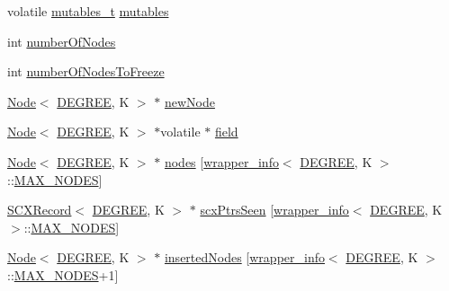 \begin{DoxyCompactItemize}
\begin{tabbing}
\end{tabbing}\item 
volatile \hyperlink{descriptors_8h_a8a5af2749482b19d7515054489efca22}{mutables\+\_\+t} \hyperlink{structbslack__ns_1_1SCXRecord_a4f87f09ecacb6e4975eeb32910f465c1}{mutables}
\item 
int \hyperlink{structbslack__ns_1_1SCXRecord_a04288a3a72e815697f4cdbf6d3a172ea}{number\+Of\+Nodes}
\item 
int \hyperlink{structbslack__ns_1_1SCXRecord_a377c265c0af0fdeb3fbb87c5fd38e353}{number\+Of\+Nodes\+To\+Freeze}
\item 
\hyperlink{structbslack__ns_1_1Node}{Node}$<$ \hyperlink{brown__sigouin__abtree__kcas_2adapter_8h_a5d88b17d70c985f2f2b8e987037fd6dd}{D\+E\+G\+R\+EE}, K $>$ $\ast$ \hyperlink{structbslack__ns_1_1SCXRecord_a98126575762cd26f08cbb6cb0177e36e}{new\+Node}
\item 
\hyperlink{structbslack__ns_1_1Node}{Node}$<$ \hyperlink{brown__sigouin__abtree__kcas_2adapter_8h_a5d88b17d70c985f2f2b8e987037fd6dd}{D\+E\+G\+R\+EE}, K $>$ $\ast$volatile $\ast$ \hyperlink{structbslack__ns_1_1SCXRecord_a04936965dc1749be6b03408ac7207003}{field}
\item 
\hyperlink{structbslack__ns_1_1Node}{Node}$<$ \hyperlink{brown__sigouin__abtree__kcas_2adapter_8h_a5d88b17d70c985f2f2b8e987037fd6dd}{D\+E\+G\+R\+EE}, K $>$ $\ast$ \hyperlink{structbslack__ns_1_1SCXRecord_a58efb08f62fc4f1256180880bbc8ca5f}{nodes} \mbox{[}\hyperlink{classbslack__ns_1_1wrapper__info}{wrapper\+\_\+info}$<$ \hyperlink{brown__sigouin__abtree__kcas_2adapter_8h_a5d88b17d70c985f2f2b8e987037fd6dd}{D\+E\+G\+R\+EE}, K $>$\+::\hyperlink{scxrecord_8h_abd2aacdca9cb2a1a30f3392256b96ea3}{M\+A\+X\+\_\+\+N\+O\+D\+ES}\mbox{]}
\item 
\hyperlink{structbslack__ns_1_1SCXRecord}{S\+C\+X\+Record}$<$ \hyperlink{brown__sigouin__abtree__kcas_2adapter_8h_a5d88b17d70c985f2f2b8e987037fd6dd}{D\+E\+G\+R\+EE}, K $>$ $\ast$ \hyperlink{structbslack__ns_1_1SCXRecord_a27987fb8ada803ab5a247431b419f5a3}{scx\+Ptrs\+Seen} \mbox{[}\hyperlink{classbslack__ns_1_1wrapper__info}{wrapper\+\_\+info}$<$ \hyperlink{brown__sigouin__abtree__kcas_2adapter_8h_a5d88b17d70c985f2f2b8e987037fd6dd}{D\+E\+G\+R\+EE}, K $>$\+::\hyperlink{scxrecord_8h_abd2aacdca9cb2a1a30f3392256b96ea3}{M\+A\+X\+\_\+\+N\+O\+D\+ES}\mbox{]}
\item 
\hyperlink{structbslack__ns_1_1Node}{Node}$<$ \hyperlink{brown__sigouin__abtree__kcas_2adapter_8h_a5d88b17d70c985f2f2b8e987037fd6dd}{D\+E\+G\+R\+EE}, K $>$ $\ast$ \hyperlink{structbslack__ns_1_1SCXRecord_aa7c02cda2c28c6bb0f9104163073462e}{inserted\+Nodes} \mbox{[}\hyperlink{classbslack__ns_1_1wrapper__info}{wrapper\+\_\+info}$<$ \hyperlink{brown__sigouin__abtree__kcas_2adapter_8h_a5d88b17d70c985f2f2b8e987037fd6dd}{D\+E\+G\+R\+EE}, K $>$\+::\hyperlink{scxrecord_8h_abd2aacdca9cb2a1a30f3392256b96ea3}{M\+A\+X\+\_\+\+N\+O\+D\+ES}+1\mbox{]}

\end{DoxyCompactItemize}
